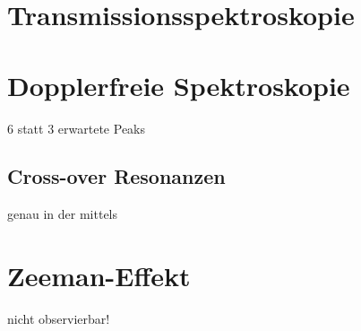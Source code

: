 \documentclass[../bericht.tex]{subfiles}
\begin{document}
    \section{Transmissionsspektroskopie}
    \label{sec:transmissionsspektroskopie}




    \section{Dopplerfreie Spektroskopie}
    \label{sec:dopplerfreie-spektroskopie}


      6 statt 3 erwartete Peaks


      \subsection{Cross-over Resonanzen}
      \label{subsec:cross-over-resonanzen}

        genau in der mittels


    \section{Zeeman-Effekt}
    \label{sec:zeeman-effekt}

      nicht observierbar!
\end{document}
